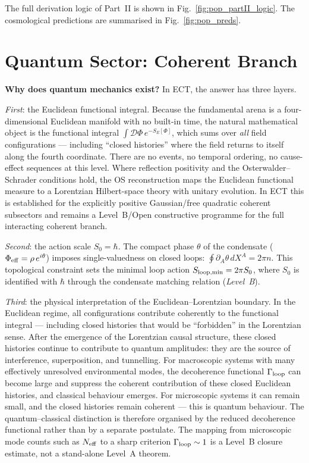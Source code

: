 \documentclass[11pt,a4paper]{article}
\begin{document}
The full derivation logic of Part~II is shown in Fig.~\ref{fig:pop_partII_logic}. The cosmological predictions are summarised in Fig.~\ref{fig:pop_preds}.

\part{Quantum Sector: Coherent Branch}
\label{part:quantum_pop}

\noindent\textbf{Why does quantum mechanics exist?} In ECT, the answer has three layers.

\emph{First}: the Euclidean functional integral. Because the fundamental arena is a four-dimensional Euclidean manifold with no built-in time, the natural mathematical object is the functional integral $\int \mathcal{D}\Phi\,e^{-S_E[\Phi]}$, which sums over \emph{all} field configurations --- including ``closed histories'' where the field returns to itself along the fourth coordinate. There are no events, no temporal ordering, no cause-effect sequences at this level. Where reflection positivity and the Osterwalder--Schrader conditions hold, the OS reconstruction maps the Euclidean functional measure to a Lorentzian Hilbert-space theory with unitary evolution. In ECT this is established for the explicitly positive Gaussian/free quadratic coherent subsectors and remains a Level~B/Open constructive programme for the full interacting coherent branch.

\emph{Second}: the action scale $S_0 = \hbar$. The compact phase $\theta$ of the condensate ($\Phi_{\rm eff} = \rho\,e^{i\theta}$) imposes single-valuedness on closed loops: $\oint \partial_A\theta\,dX^A = 2\pi n$. This topological constraint sets the minimal loop action $S_{\rm loop,min} = 2\pi S_0$, where $S_0$ is identified with $\hbar$ through the condensate matching relation (\emph{Level~B}).

\emph{Third}: the physical interpretation of the Euclidean--Lorentzian boundary. In the Euclidean regime, all configurations contribute coherently to the functional integral --- including closed histories that would be ``forbidden'' in the Lorentzian sense. After the emergence of the Lorentzian causal structure, these closed histories continue to contribute to quantum amplitudes: they are the source of interference, superposition, and tunnelling. For macroscopic systems with many effectively unresolved environmental modes, the decoherence functional $\Gamma_{\rm loop}$ can become large and suppress the coherent contribution of these closed Euclidean histories, and classical behaviour emerges. For microscopic systems it can remain small, and the closed histories remain coherent --- this is quantum behaviour. The quantum--classical distinction is therefore organised by the reduced decoherence functional rather than by a separate postulate. The mapping from microscopic mode counts such as $N_{\rm eff}$ to a sharp criterion $\Gamma_{\rm loop}\sim1$ is a Level~B closure estimate, not a stand-alone Level~A theorem.
\end{document}
